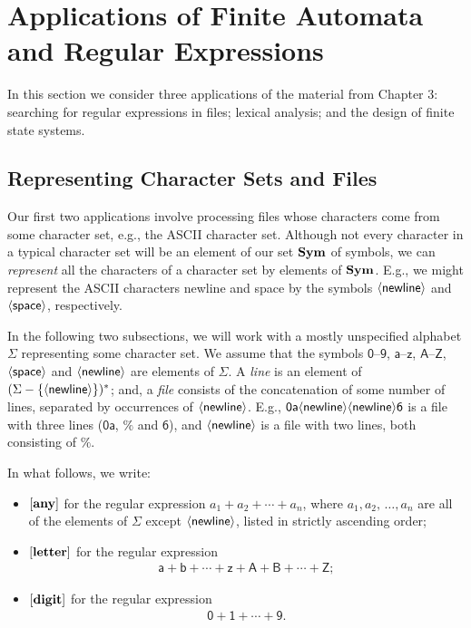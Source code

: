 \section{Applications of Finite Automata and
Regular Expressions}
\label{ApplicationsOfFiniteAutomataAndRegularExpressions}

%

In this section we consider three applications of the material from
Chapter 3: searching for regular expressions in files; lexical
analysis; and the design of finite state systems.

\subsection{Representing Character Sets and Files}

Our first two applications involve processing files whose characters
come from some character set, e.g., the ASCII character set.  Although
not every character in a typical character set will be an element of
our set $\mathbf{Sym}$ of symbols, we can \emph{represent} all the characters
of a character set by elements of $\mathbf{Sym}$.  E.g., we might represent
the ASCII characters newline and space by the symbols $\mathsf{\langle newline\rangle}$
and $\mathsf{\langle space\rangle}$, respectively.

In the following two subsections, we will work with a mostly
unspecified alphabet $\Sigma$ representing some character set.  We
assume that the symbols $\mathsf{0}$--$\mathsf{9}$,
$\mathsf{a}$--$\mathsf{z}$, $\mathsf{A}$--$\mathsf{Z}$, $\mathsf{\langle space\rangle}$
and $\mathsf{\langle newline\rangle}$ are elements of $\Sigma$.  A \emph{line} is
an element of $(\Sigma-\{\mathsf{\langle newline\rangle}\})^*$; and, a
\emph{file} consists of the concatenation of some number of lines,
separated by occurrences of $\mathsf{\langle newline\rangle}$.  E.g.,
$\mathsf{0a\mathsf{\langle newline\rangle}\mathsf{\langle newline\rangle} 6}$ is a file with three lines
($\mathsf{0a}$, $\mathsf{\%}$ and $\mathsf{6}$), and
$\mathsf{\mathsf{\langle newline\rangle}}$ is a file with two lines, both consisting of
$\%$.

In what follows, we write:
\begin{itemize}
\item $[\mathbf{any}]$ for the regular expression $a_1+a_2+\cdots+a_n$, where
  $a_1,a_2,\,\ldots,a_n$ are all of the elements of $\Sigma$ except
  $\mathsf{\langle newline\rangle}$, listed in strictly ascending order;

\item $[\mathbf{letter}]$ for the regular expression
  \begin{gather*}
    \mathsf{a + b + \cdots + z + A + B + \cdots + Z};
  \end{gather*}

\item $[\mathbf{digit}]$ for the regular expression
  \begin{gather*}
    \mathsf{0 + 1 + \cdots + 9}.
  \end{gather*}
\end{itemize}

